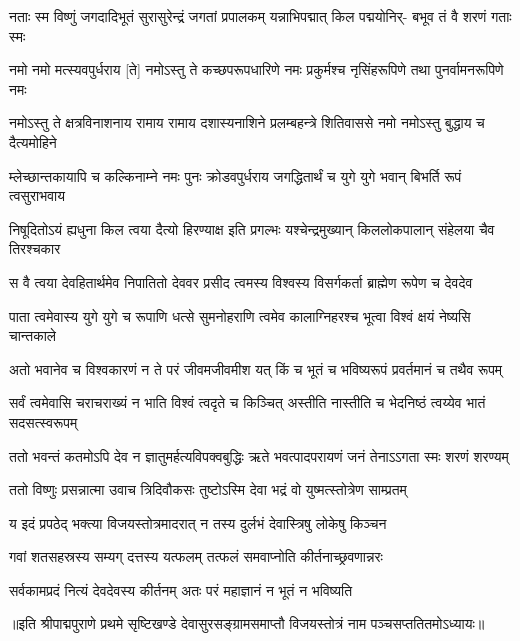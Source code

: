 
\addtocounter{shlokacount}{88}

\fourlineindentedshloka
{नताः स्म विष्णुं जगदादिभूतं}
{सुरासुरेन्द्रं जगतां प्रपालकम्}
{यन्नाभिपद्मात् किल पद्मयोनिर्-}
{बभूव तं वै शरणं गताः स्मः} %

\fourlineindentedshloka
{नमो नमो मत्स्यवपुर्धराय [ते]}
{नमोऽस्तु ते कच्छपरूपधारिणे}
{नमः प्रकुर्मश्च नृसिंहरूपिणे}
{तथा पुनर्वामनरूपिणे नमः} %

\fourlineindentedshloka
{नमोऽस्तु ते क्षत्रविनाशनाय}
{रामाय रामाय दशास्यनाशिने}
{प्रलम्बहन्त्रे शितिवाससे नमो}
{नमोऽस्तु बुद्धाय च दैत्यमोहिने} %

\fourlineindentedshloka
{म्लेच्छान्तकायापि च कल्किनाम्ने}
{नमः पुनः क्रोडवपुर्धराय}
{जगद्धितार्थं च युगे युगे भवान्}
{बिभर्ति रूपं त्वसुराभवाय} %

\fourlineindentedshloka
{निषूदितोऽयं ह्यधुना किल त्वया}
{दैत्यो हिरण्याक्ष इति प्रगल्भः}
{यश्चेन्द्रमुख्यान् किललोकपालान्}
{संहेलया चैव तिरश्चकार} %

\fourlineindentedshloka
{स वै त्वया देवहितार्थमेव}
{निपातितो देववर प्रसीद}
{त्वमस्य विश्वस्य विसर्गकर्ता}
{ब्राह्मेण रूपेण च देवदेव} %

\fourlineindentedshloka
{पाता त्वमेवास्य युगे युगे च}
{रूपाणि धत्से सुमनोहराणि}
{त्वमेव कालाग्निहरश्च भूत्वा}
{विश्वं क्षयं नेष्यसि चान्तकाले} %

\fourlineindentedshloka
{अतो भवानेव च विश्वकारणं}
{न ते परं जीवमजीवमीश}
{यत् किं च भूतं च भविष्यरूपं}
{प्रवर्तमानं च तथैव रूपम्} %

\fourlineindentedshloka
{सर्वं त्वमेवासि चराचराख्यं}
{न भाति विश्वं त्वदृते च किञ्चित्}
{अस्तीति नास्तीति च भेदनिष्ठं}
{त्वय्येव भातं सदसत्स्वरूपम्} %

\fourlineindentedshloka
{ततो भवन्तं कतमोऽपि देव}
{न ज्ञातुमर्हत्यविपक्वबुद्धिः}
{ऋते भवत्पादपरायणं जनं}
{तेनाऽऽगता स्मः शरणं शरण्यम्} %


\twolineshloka
{ततो विष्णुः प्रसन्नात्मा उवाच त्रिदिवौकसः}
{तुष्टोऽस्मि देवा भद्रं वो युष्मत्स्तोत्रेण साम्प्रतम्} %

\twolineshloka
{य इदं प्रपठेद् भक्त्या विजयस्तोत्रमादरात्}
{न तस्य दुर्लभं देवास्त्रिषु लोकेषु किञ्चन} %

\twolineshloka
{गवां शतसहस्रस्य सम्यग् दत्तस्य यत्फलम्}
{तत्फलं समवाप्नोति कीर्तनाच्छ्रवणान्नरः} %

\twolineshloka
{सर्वकामप्रदं नित्यं देवदेवस्य कीर्तनम्}
{अतः परं महाज्ञानं न भूतं न भविष्यति} %

॥इति श्रीपाद्मपुराणे प्रथमे सृष्टिखण्डे देवासुरसङ्ग्रामसमाप्तौ विजयस्तोत्रं नाम पञ्चसप्ततितमोऽध्यायः॥ %